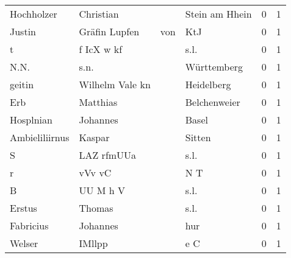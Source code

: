 \begin{tabular}{llllrr}
               Hochholzer &                          Christian &             &                              Stein am Hhein &          0 &         1 \\
                   Justin &                     Gräfin  Lupfen &         von &                                         KtJ &          0 &         1 \\
                        t &                         f IcX w kf &             &                                        s.l. &          0 &         1 \\
                     N.N. &                               s.n. &             &                                 Württemberg &          0 &         1 \\
                   geitin &                    Wilhelm Vale kn &             &                                  Heidelberg &          0 &         1 \\
                      Erb &                           Matthias &             &                                Belchenweier &          0 &         1 \\
                Hosplnian &                           Johannes &             &                                       Basel &          0 &         1 \\
           Ambieliliirnus &                             Kaspar &             &                                      Sitten &          0 &         1 \\
                        S &                         LAZ rfmUUa &             &                                        s.l. &          0 &         1 \\
                        r &                             vVv vC &             &                                         N T &          0 &         1 \\
                        B &                           UU M h V &             &                                        s.l. &          0 &         1 \\
                   Erstus &                             Thomas &             &                                        s.l. &          0 &         1 \\
                Fabricius &                           Johannes &             &                                         hur &          0 &         1 \\
                   Welser &                             IMllpp &             &                                         e C &          0 &         1 \\

\end{tabular}
